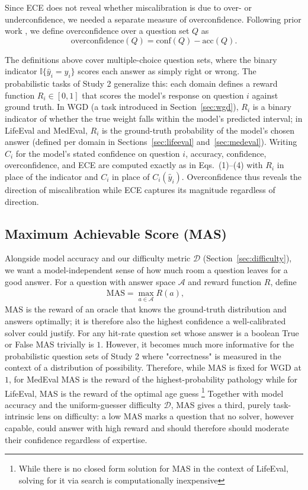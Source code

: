 \documentclass{article}
\begin{document}
Since ECE does not reveal whether miscalibration is due to over- or underconfidence, we needed a separate measure of overconfidence. Following prior work \citep{KLAYMAN1999216}, we define overconfidence over a question set $Q$ as
{
\begin{equation}
    \text{overconfidence}(Q) = \text{conf}(Q) - \text{acc}(Q).
\end{equation}}



The definitions above cover multiple-choice question sets, where the binary indicator $\mathbb{I}\{\hat{y}_i = y_i\}$ scores each answer as simply right or wrong. The probabilistic tasks of Study 2 generalize this: each domain defines a reward function $R_i \in [0,1]$ that scores the model's response on question $i$ against ground truth. In WGD (a task introduced in Section~\ref{sec:wgd}), $R_i$ is a binary indicator of whether the true weight falls within the model's predicted interval; in LifeEval and MedEval, $R_i$ is the ground-truth probability of the model's chosen answer (defined per domain in Sections~\ref{sec:lifeeval} and~\ref{sec:medeval}). Writing $C_i$ for the model's stated confidence on question $i$, accuracy, confidence, overconfidence, and ECE are computed exactly as in Eqs.~(1)--(4) with $R_i$ in place of the indicator and $C_i$ in place of $C_i(\hat{y}_i)$. Overconfidence thus reveals the direction of miscalibration while ECE captures its magnitude regardless of direction.

\subsection{Maximum Achievable Score (MAS)}
\label{sec:mas}

Alongside model accuracy and our difficulty metric $\mathcal{D}$ (Section~\ref{sec:difficulty}), we want a model-independent sense of how much room a question leaves for a good answer. For a question with answer space $\mathcal{A}$ and reward function $R$, define
\begin{align}
    \mathrm{MAS} = \max_{a \in \mathcal{A}} R(a), \qquad
\end{align}
MAS is the reward of an oracle that knows the ground-truth distribution and answers optimally; it is therefore also the highest confidence a well-calibrated solver could justify. For any hit-rate question set whose answer is a boolean True or False MAS trivially is $1$. However, it becomes much more informative for the probabilistic question sets of Study 2 where "correctness" is measured in the context of a distribution of possibility. Therefore, while MAS is fixed for WGD at $1$, for MedEval MAS is the reward of the highest-probability pathology while for LifeEval, MAS is the reward of the optimal age guess \footnote{While there is no closed form solution for MAS in the context of LifeEval, solving for it via search is computationally inexpensive} Together with model accuracy and the uniform-guesser difficulty $\mathcal{D}$, MAS gives a third, purely task-intrinsic lens on difficulty: a low MAS marks a question that no solver, however capable, could answer with high reward and should therefore should moderate their confidence regardless of expertise.
\end{document}
